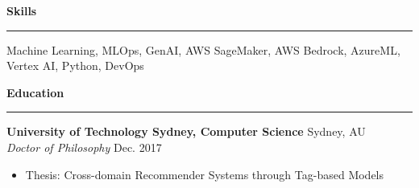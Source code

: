 \documentclass[a4paper,10pt]{article}
\begin{document}
\vspace{0.5em}

\begin{center}
    \textbf{\large Skills} \\
    \rule{\textwidth}{0.1pt}
\end{center}
Machine Learning, MLOps, GenAI, AWS SageMaker, AWS Bedrock, AzureML, Vertex AI, Python, DevOps

\vspace{0.5em}

\begin{center}
    \textbf{\large Education} \\
    \rule{\textwidth}{0.1pt}
\end{center}

\noindent
\textbf{University of Technology Sydney, Computer Science} \hfill Sydney, AU \\
\textit{Doctor of Philosophy} \hfill Dec. 2017 \\
\begin{itemize}[leftmargin=0.15in, itemsep=1pt]
    \item Thesis: Cross-domain Recommender Systems through Tag-based Models
\end{itemize}
\end{document}

